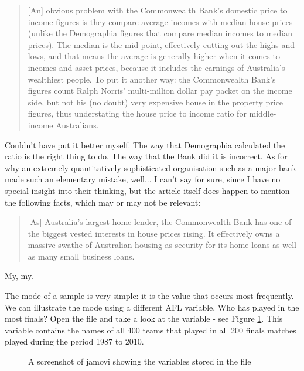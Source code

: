 \begin{quote}
[An] obvious problem with the Commonwealth Bank's domestic price to income figures is they compare average incomes with median house prices (unlike the Demographia figures that compare median incomes to median prices). The median is the mid-point, effectively cutting out the highs and lows, and that means the average is generally higher when it comes to incomes and asset prices, because it includes the earnings of Australia's wealthiest people. To put it another way: the Commonwealth Bank's figures count Ralph Norris' multi-million dollar pay packet on the income side, but not his (no doubt) very expensive house in the property price figures, thus understating the house price to income ratio for middle-income Australians.
\end{quote}
Couldn't have put it better myself. The way that Demographia calculated the ratio is the right thing to do. The way that the Bank did it is incorrect. As for why an extremely quantitatively sophisticated organisation such as a major bank made such an elementary mistake, well... I can't say for sure, since I have no special insight into their thinking, but the article itself does happen to mention the following facts, which may or may not be relevant:
\begin{quote}
[As] Australia's largest home lender, the Commonwealth Bank has one of the biggest vested interests in house prices rising. It effectively owns a massive swathe of Australian housing as security for its home loans as well as many small business loans.
\end{quote}
My, my. 


The mode of a sample is very simple: it is the value that occurs most frequently. We can illustrate the mode using a different AFL variable, Who has played in the most finals? Open the  file and take a look at the  variable - see Figure \ref{fig:aflsmall_finalists}. This variable contains the names of all 400 teams that played in all 200 finals matches played during the period 1987 to 2010. 
\vspace{1cm}
\begin{figure}[h]
\begin{center}
\caption{A screenshot of jamovi showing the variables stored in the  file}
\label{fig:aflsmall_finalists}
\HR
\end{center}
\end{figure}


